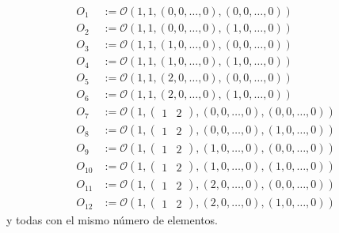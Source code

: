 \documentclass{article}
\theoremstyle{definition}
\begin{document}
\begin{align*}
    O_1&:=\mathcal{O}(1,1,(0,0,\dots,0),(0,0,\dots,0)) \\
    O_2&:=\mathcal{O}(1,1,(0,0,\dots,0),(1,0,\dots,0)) \\
    O_3&:=\mathcal{O}(1,1,(1,0,\dots,0),(0,0,\dots,0)) \\
    O_4&:=\mathcal{O}(1,1,(1,0,\dots,0),(1,0,\dots,0)) \\
    O_5&:=\mathcal{O}(1,1,(2,0,\dots,0),(0,0,\dots,0)) \\
    O_6&:=\mathcal{O}(1,1,(2,0,\dots,0),(1,0,\dots,0)) \\
    O_7&:=\mathcal{O}(1,\begin{pmatrix}
        1 & 2
    \end{pmatrix},(0,0,\dots,0),(0,0,\dots,0)) \\
    O_8&:=\mathcal{O}(1,\begin{pmatrix}
        1 & 2
    \end{pmatrix},(0,0,\dots,0),(1,0,\dots,0)) \\
    O_9&:=\mathcal{O}(1,\begin{pmatrix}
        1 & 2
    \end{pmatrix},(1,0,\dots,0),(0,0,\dots,0)) \\
    O_{10}&:=\mathcal{O}(1,\begin{pmatrix}
        1 & 2
    \end{pmatrix},(1,0,\dots,0),(1,0,\dots,0)) \\
    O_{11}&:=\mathcal{O}(1,\begin{pmatrix}
        1 & 2
    \end{pmatrix},(2,0,\dots,0),(0,0,\dots,0)) \\
    O_{12}&:=\mathcal{O}(1,\begin{pmatrix}
        1 & 2
    \end{pmatrix},(2,0,\dots,0),(1,0,\dots,0)) 
\end{align*}
y todas con el mismo número de elementos.
\end{document}
